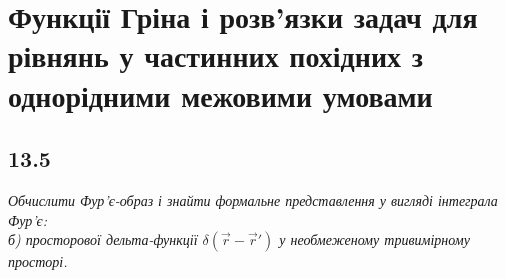 \documentclass[a4paper, 14pt]{extreport}
\begin{document}
\chapter{Функції Гріна і розв’язки задач для рівнянь у частинних похідних з однорідними межовими умовами}

\section[Задача №13.5]{13.5}

\textit{Обчислити Фур’є-образ і знайти формальне представлення у вигляді інтеграла Фур’є:\\ 
б) просторової дельта-функції $\delta(\vec{r} - \vec{r}')$ у необмеженому тривимірному просторі.}
\end{document}

